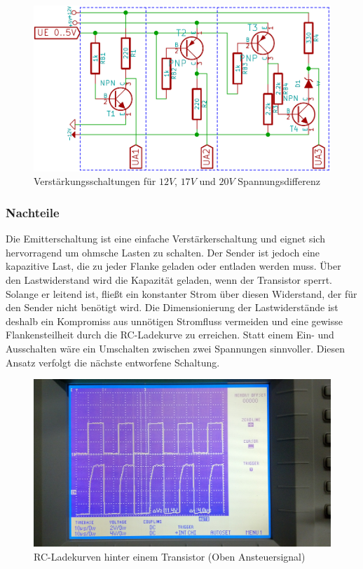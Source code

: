\begin{figure}[H]
\centering
\includegraphics[scale=0.6]{images/transistorschaltungen.png}
\caption{Verstärkungsschaltungen für $12V$, $17V$ und $20V$ Spannungsdifferenz} \label{img:I3}
\end{figure}

\subsubsection{Nachteile}
Die Emitterschaltung ist eine einfache Verstärkerschaltung und eignet sich hervorragend um ohmsche Lasten zu schalten. Der Sender ist jedoch eine kapazitive Last, die zu jeder Flanke geladen oder entladen werden muss. Über den Lastwiderstand wird die Kapazität geladen, wenn der Transistor sperrt. Solange er leitend ist, fließt ein konstanter Strom über diesen Widerstand, der für den Sender nicht benötigt wird. Die Dimensionierung der Lastwiderstände ist deshalb ein Kompromiss aus unnötigen Stromfluss vermeiden und eine gewisse Flankensteilheit durch die RC-Ladekurve zu erreichen. Statt einem Ein- und Ausschalten wäre ein Umschalten zwischen zwei Spannungen sinnvoller. Diesen Ansatz verfolgt die nächste entworfene Schaltung.

\begin{figure}[H]
\centering
\includegraphics[scale=0.14]{oszi/15-04-01/2.jpg}
\caption{RC-Ladekurven hinter einem Transistor (Oben Ansteuersignal)} \label{img:I4}
\end{figure}

